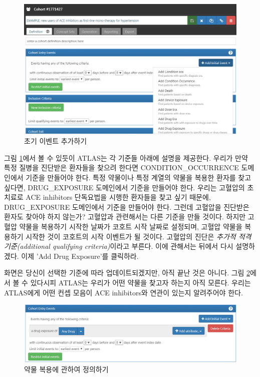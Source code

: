 \documentclass[11pt]{book}
\theoremstyle{definition}
\theoremstyle{definition}
\theoremstyle{definition}
\theoremstyle{remark}
\begin{document}
\begin{figure}

{\centering \includegraphics[width=1\linewidth]{images/Cohorts/ATLAS-initialevent} 

}

\caption{초기 이벤트 추가하기}\label{fig:ATLASinitialevent}
\end{figure}

그림 \ref{fig:ATLASinitialevent}에서 볼 수 있듯이 ATLAS는 각 기준들
아래에 설명을 제공한다. 우리가 만약 특정 질병을 진단받은 환자들을 찾으려
한다면 CONDITION\_OCCURRENCE 도메인에서 기준을 만들어야 한다. 특정
약물이나 특정 계열의 약물을 복용한 환자를 찾고 싶다면, DRUG\_EXPOSURE
도메인에서 기준을 만들어야 한다. 우리는 고혈압의 초치료로 ACE inhibitors
단독요법을 시행한 환자들을 찾고 싶기 때문에, DRUG\_EXPOSURE 도메인에서
기준을 만들어야 한다. 그런데 고혈압을 진단받은 환자도 찾아야 하지
않는가? 고혈압과 관련해서는 다른 기준을 만들 것이다. 하지만 고혈압
약물을 복용하기 시작한 날짜가 코호트 시작 날짜로 설정되며, 고혈압 약물을
복용하기 시작한 것이 코호트의 시작 이벤트가 될 것이다. 고혈압의 진단은
\emph{추가적 적격 기준(additional qualifying criteria)}이라고 부른다.
이에 관해서는 뒤에서 다시 설명하겠다. 이제 'Add Drug Exposure'를
클릭하라.

화면은 당신이 선택한 기준에 따라 업데이트되겠지만, 아직 끝난 것은
아니다. 그림 \ref{fig:ATLASdrugexposure}에서 볼 수 있다시피 ATLAS는
우리가 어떤 약물을 찾고자 하는지 아직 모른다. 우리는 ATLAS에게 어떤 컨셉
모음이 ACE inhibitors와 연관이 있는지 알려주어야 한다.

\begin{figure}

{\centering \includegraphics[width=1\linewidth]{images/Cohorts/ATLAS-drugexposure} 

}

\caption{약물 복용에 관하여 정의하기}\label{fig:ATLASdrugexposure}
\end{figure}
\end{document}
